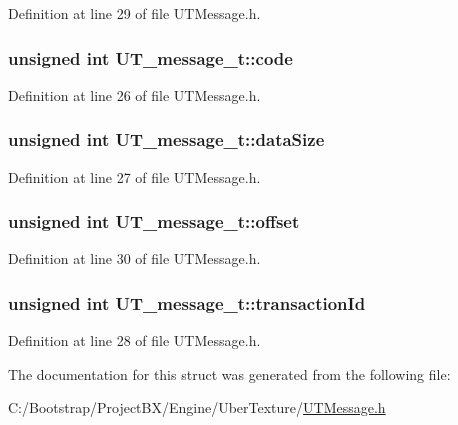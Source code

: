 Definition at line 29 of file UTMessage.h.\hypertarget{struct_u_t__message__t_33ca047b2521e6334191ce0ac75de989}{
\subsubsection[{code}]{\setlength{\rightskip}{0pt plus 5cm}unsigned int {\bf UT\_\-message\_\-t::code}}}
\label{struct_u_t__message__t_33ca047b2521e6334191ce0ac75de989}




Definition at line 26 of file UTMessage.h.\hypertarget{struct_u_t__message__t_643aa37f3d335c5da312058e14db18ab}{
\subsubsection[{dataSize}]{\setlength{\rightskip}{0pt plus 5cm}unsigned int {\bf UT\_\-message\_\-t::dataSize}}}
\label{struct_u_t__message__t_643aa37f3d335c5da312058e14db18ab}




Definition at line 27 of file UTMessage.h.\hypertarget{struct_u_t__message__t_e62d8e5f701d54035819d94112ded939}{
\subsubsection[{offset}]{\setlength{\rightskip}{0pt plus 5cm}unsigned int {\bf UT\_\-message\_\-t::offset}}}
\label{struct_u_t__message__t_e62d8e5f701d54035819d94112ded939}




Definition at line 30 of file UTMessage.h.\hypertarget{struct_u_t__message__t_f8f8e94a39bdefd006d6f806cc8e6737}{
\subsubsection[{transactionId}]{\setlength{\rightskip}{0pt plus 5cm}unsigned int {\bf UT\_\-message\_\-t::transactionId}}}
\label{struct_u_t__message__t_f8f8e94a39bdefd006d6f806cc8e6737}




Definition at line 28 of file UTMessage.h.

The documentation for this struct was generated from the following file:\begin{CompactItemize}
\item 
C:/Bootstrap/ProjectBX/Engine/UberTexture/\hyperlink{_u_t_message_8h}{UTMessage.h}\end{CompactItemize}
